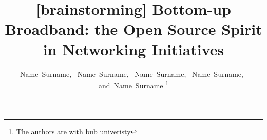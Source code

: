 \documentclass[journal]{IEEEtran}
\begin{document}
%
\title{[brainstorming] Bottom-up Broadband: the Open Source Spirit in Networking Initiatives}
%
%
%

\author{
	Name~Surname,~%
    Name~Surname,~%
    Name~Surname,~%
    Name~Surname,~%
    and~Name~Surname%
\thanks{The authors are with bub univeristy}
}


% 
%



% 
\end{document}
